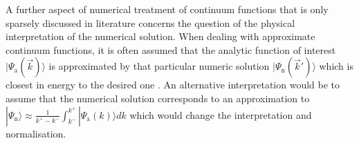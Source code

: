 A further aspect of numerical treatment of continuum functions that is only sparsely discussed in literature concerns the question of the physical interpretation of the numerical solution.
When dealing with approximate continuum functions, it is often assumed that the analytic function of interest $|\Psi_\text{a}(\vec{k})\rangle$ is approximated by that particular numeric solution $|\Psi_\text{n}(\vec{k}')\rangle$ which is closest in energy to the desired one \cite{H2pDeCleva}.
An alternative interpretation would be to assume that the numerical solution corresponds to an approximation to $|\Psi_\text{n}\rangle \approx \frac{1}{k^+-k^-} \int_{k^-}^{k^+}|\Psi_\text{a}(k) \rangle dk$ which would change the interpretation and normalisation.
%

